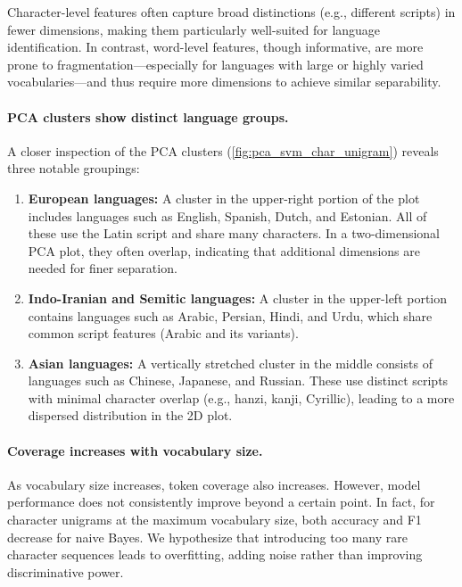 Character-level features often capture broad distinctions (e.g., different scripts) in fewer dimensions, making them particularly well-suited for language identification. In contrast, word-level features, though informative, are more prone to fragmentation—especially for languages with large or highly varied vocabularies—and thus require more dimensions to achieve similar separability.

\paragraph{PCA clusters show distinct language groups.}
A closer inspection of the PCA clusters (\cref{fig:pca_svm_char_unigram}) reveals three notable groupings:

\begin{enumerate}
  \item \textbf{European languages:} A cluster in the upper-right portion of the plot includes languages such as English, Spanish, Dutch, and Estonian. All of these use the Latin script and share many characters. In a two-dimensional PCA plot, they often overlap, indicating that additional dimensions are needed for finer separation.

  \item \textbf{Indo-Iranian and Semitic languages:} A cluster in the upper-left portion contains languages such as Arabic, Persian, Hindi, and Urdu, which share common script features (Arabic and its variants).

  \item \textbf{Asian languages:} A vertically stretched cluster in the middle consists of languages such as Chinese, Japanese, and Russian. These use distinct scripts with minimal character overlap (e.g., hanzi, kanji, Cyrillic), leading to a more dispersed distribution in the 2D plot.
\end{enumerate}

\paragraph{Coverage increases with vocabulary size.}
As vocabulary size increases, token coverage also increases. However, model performance does not consistently improve beyond a certain point. In fact, for character unigrams at the maximum vocabulary size, both accuracy and F1 decrease for naive Bayes. We hypothesize that introducing too many rare character sequences leads to overfitting, adding noise rather than improving discriminative power.

